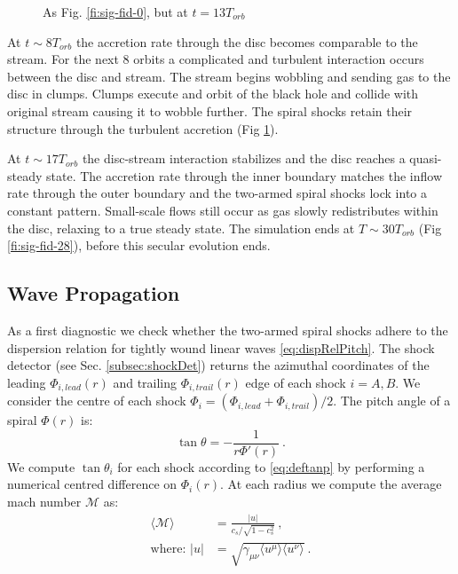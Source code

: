 \documentclass{emulateapj}
\begin{document}
\begin{figure}
\caption{\label{fi:sig-fid-13} As Fig. \ref{fi:sig-fid-0}, but at $t = 13 T_{orb}$}
\end{figure}

At $t\sim 8 T_{orb}$ the accretion rate through the disc becomes comparable to the stream.  For the next 8 orbits a complicated and turbulent interaction occurs between the disc and stream.  The stream begins wobbling and sending gas to the disc in clumps.  Clumps execute and orbit of the black hole and collide with original stream causing it to wobble further.  The spiral shocks retain their structure through the turbulent accretion (Fig \ref{fi:sig-fid-13}).

At $t\sim17 T_{orb}$ the disc-stream interaction stabilizes and the disc reaches a quasi-steady state.  The accretion rate through the inner boundary matches the inflow rate through the outer boundary and the two-armed spiral shocks lock into a constant pattern.  Small-scale flows still occur as gas slowly redistributes within the disc, relaxing to a true steady state.  The simulation ends at $T\sim30 T_{orb}$ (Fig \ref{fi:sig-fid-28}), before this secular evolution ends.

\begin{figure*}
\caption{\label{fi:sig-fid-28} As Fig. \ref{fi:sig-fid-0}, but at $t = 28 T_{orb}$}
\end{figure*}

\subsection{Wave Propagation}
\label{subsec:res-prop}

As a first diagnostic we check whether the two-armed spiral shocks adhere to the dispersion relation for tightly wound linear waves \eqref{eq:dispRelPitch}.  The shock detector (see Sec. \ref{subsec:shockDet}) returns the azimuthal coordinates of the leading $\Phi_{i,lead}(r)$ and trailing $\Phi_{i,trail}(r)$ edge of each shock $i=A,B$.  We consider the centre of each shock $\Phi_i = (\Phi_{i,lead} + \Phi_{i,trail}) / 2$.  The pitch angle of a spiral $\Phi(r)$ is:
\begin{equation}
	\tan \theta = -\frac{1}{r \Phi'(r)} \ . \label{eq:deftanp} 
\end{equation}
We compute $\tan \theta_i$ for each shock according to \eqref{eq:deftanp} by performing a numerical centred difference on $\Phi_i(r)$.  At each radius we compute the average mach number $\mathcal{M}$ as:
\begin{align}
	\langle \mathcal{M} \rangle &=  \frac{|u|}{c_s / \sqrt{1-c_s^2}} \ , \\
	\text{where: } |u| &= \sqrt{\gamma_{\mu\nu} \langle u^\mu \rangle  \langle u^\nu \rangle} \nonumber \ .
\end{align}
\end{document}
